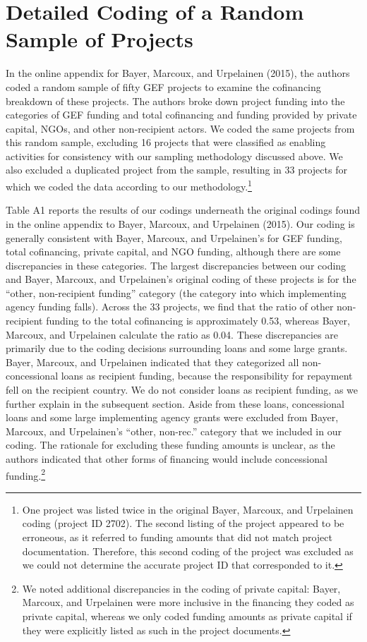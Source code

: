 \documentclass{article}
\begin{document}
\section{Detailed Coding of a Random Sample of Projects}
In the online appendix for Bayer, Marcoux, and Urpelainen (2015), the authors coded a random sample of fifty GEF projects to examine the cofinancing breakdown of these projects. The authors broke down project funding into the categories of GEF funding and total cofinancing and funding provided by private capital, NGOs, and other non-recipient actors. We coded the same projects from this random sample, excluding 16 projects that were classified as enabling activities for consistency with our sampling methodology discussed above. We also excluded a duplicated project from the sample, resulting in 33 projects for which we coded the data according to our methodology.\footnote{One project was listed twice in the original Bayer, Marcoux, and Urpelainen coding (project ID 2702). The second listing of the project appeared to be erroneous, as it referred to funding amounts that did not match project documentation. Therefore, this second coding of the project was excluded as we could not determine the accurate project ID that corresponded to it.} 								

Table A1 reports the results of our codings underneath the original codings found in the online appendix to Bayer, Marcoux, and Urpelainen (2015). Our coding is generally consistent with Bayer, Marcoux, and Urpelainen’s for GEF funding, total cofinancing, private capital, and NGO funding, although there are some discrepancies in these categories. The largest discrepancies between our coding and Bayer, Marcoux, and Urpelainen’s original coding of these projects is for the “other, non-recipient funding” category (the category into which implementing agency funding falls). Across the 33 projects, we find that the ratio of other non-recipient funding to the total cofinancing is approximately 0.53, whereas Bayer, Marcoux, and Urpelainen calculate the ratio as 0.04. These discrepancies are primarily due to the coding decisions surrounding loans and some large grants. Bayer, Marcoux, and Urpelainen indicated that they categorized all non-concessional loans as recipient funding, because the responsibility for repayment fell on the recipient country. We do not consider loans as recipient funding, as we further explain in the subsequent section. Aside from these loans, concessional loans and some large implementing agency grants were excluded from Bayer, Marcoux, and Urpelainen’s “other, non-rec.” category that we included in our coding. The rationale for excluding these funding amounts is unclear, as the authors indicated that other forms of financing would include concessional funding.\footnote{We noted additional discrepancies in the coding of private capital: Bayer, Marcoux, and Urpelainen were more inclusive in the financing they coded as private capital, whereas we only coded funding amounts as private capital if they were explicitly listed as such in the project documents.}
\end{document}
